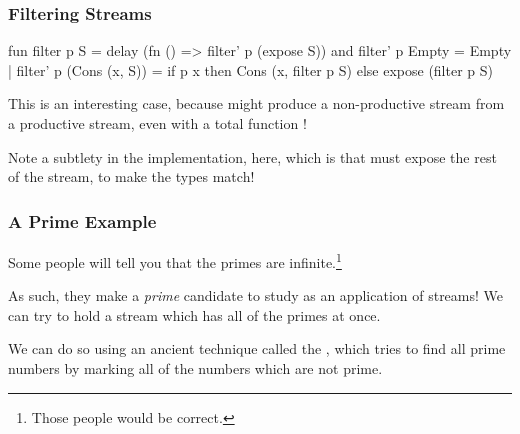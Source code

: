 \documentclass[aspectratio=169]{beamer}
\begin{document}
\begin{frame}[fragile]
  \frametitle{Filtering Streams}

  \begin{codeblock}
    fun filter  p S = delay (fn () => filter' p (expose S))
    and filter' p Empty = Empty
      | filter' p (Cons (x, S)) =
          if p x then Cons (x, filter p S)
          else expose (filter p S)
  \end{codeblock}

  \pause
  \vspace{\fill}

  This is an interesting case, because  might produce a non-productive
  stream from a productive stream, even with a total function !

  \pause
  \vspace{\fill}

  Note a subtlety in the implementation, here, which is that  must
  expose the rest of the stream, to make the types match!

  \pause
  \vspace{\fill}

\end{frame}


\begin{frame}[fragile]
  \frametitle{A Prime Example}

  Some people will tell you that the primes are infinite.\footnote{Those people would be correct.}

  \pause
  \vspace{\fill}

  As such, they make a \textit{prime} candidate to study as an application of
  streams! We can try to hold a stream which has all of the primes at once.

  \pause
  \vspace{\fill}

  We can do so using an ancient technique called the ,
  which tries to find all prime numbers by marking all of the numbers which are
  not prime.
\end{frame}
\end{document}
